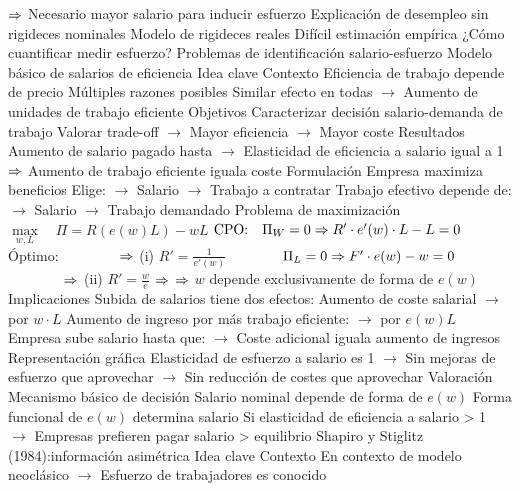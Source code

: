 \documentclass{nuevotema}
\begin{document}
\begin{esquemal}
				\4[] $\Rightarrow$ Necesario mayor salario para inducir esfuerzo
				\4 Explicación de desempleo sin rigideces nominales
				\4 Modelo de rigideces reales
				\4 Difícil estimación empírica
				\4[] ¿Cómo cuantificar medir esfuerzo?
				\4[] Problemas de identificación salario-esfuerzo
		\2 Modelo básico de salarios de eficiencia
			\3 Idea clave
				\4 Contexto
				\4[] Eficiencia de trabajo depende de precio
				\4[] Múltiples razones posibles
				\4[] Similar efecto en todas
				\4[] $\to$ Aumento de unidades de trabajo eficiente
				\4 Objetivos
				\4[] Caracterizar decisión salario-demanda de trabajo
				\4[] Valorar trade-off
				\4[] $\to$ Mayor eficiencia
				\4[] $\to$ Mayor coste
				\4 Resultados
				\4[] Aumento de salario pagado hasta
				\4[] $\to$ Elasticidad de eficiencia a salario igual a 1
				\4[] $\Rightarrow$ Aumento de trabajo eficiente iguala coste
			\3 Formulación
				\4 Empresa maximiza beneficios
				\4[] Elige:
				\4[] $\to$ Salario
				\4[] $\to$ Trabajo a contratar
				\4[] Trabajo efectivo depende de:
				\4[] $\to$ Salario
				\4[] $\to$ Trabajo demandado
				\4 Problema de maximización
				\4[] $\underset{w,L}{\max} \quad \Pi = R(e(w) L ) - w L$
				\4[] $\text{CPO:} \quad \Pi_W = 0 \Rightarrow R' \cdot e' (w) \cdot L - L = 0$
				\4 Óptimo:
				\4[] $\quad \quad \quad \quad \Rightarrow$ (i) $R' = \frac{1}{e'(w)}$
				\4[] $\quad \quad \quad \, \, \, \, \Pi_L = 0 \Rightarrow F' \cdot e(w) - w = 0$
				\4[] $\quad \quad \quad \quad \Rightarrow$ (ii) $R' = \frac{w}{e}$
				\4[] $\Rightarrow$ 
				\4[] $\Rightarrow$ $w$ depende exclusivamente de forma de $e(w)$
			\3 Implicaciones
				\4 Subida de salarios tiene dos efectos:
				\4[] Aumento de coste salarial
				\4[] $\to$ por $w\cdot L$
				\4[] Aumento de ingreso por más trabajo eficiente:
				\4[] $\to$ por $e(w) L$
				\4 Empresa sube salario hasta que:
				\4[] $\to$ Coste adicional iguala aumento de ingresos
				\4 Representación gráfica
				\4[] 
				\4[] Elasticidad de esfuerzo a salario es 1
				\4[] $\to$ Sin mejoras de esfuerzo que aprovechar
				\4[] $\to$ Sin reducción de costes que aprovechar
			\3 Valoración
				\4 Mecanismo básico de decisión
				\4 Salario nominal depende de forma de $e(w)$
				\4 Forma funcional de $e(w)$ determina salario
				\4[] Si elasticidad de eficiencia a salario > 1
				\4[] $\to$ Empresas prefieren pagar salario > equilibrio
		\2 Shapiro y Stiglitz (1984):información asimétrica
			\3 Idea clave
				\4 Contexto
				\4[] En contexto de modelo neoclásico
				\4[] $\to$ Esfuerzo de trabajadores es conocido

\end{esquemal}
\end{document}
